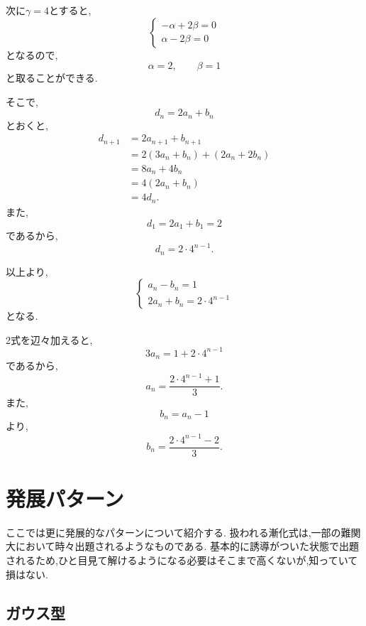 \documentclass[dvipdfmx,a4paper,11pt,fleqn,openany]{jsbook}
\begin{document}
\begin{enumerate}[label=(\arabic*),parsep=3pt]
            次に$\gamma=4$とすると,
            \[
            \begin{cases}
              -\alpha+2\beta=0\\
              \alpha-2\beta=0
            \end{cases}
            \]
            となるので,
            \[
              \alpha=2,\qquad\beta=1
            \]
            と取ることができる.

            そこで,
            \[
              d_n=2a_n+b_n
            \]
            とおくと,
            \begin{align*}
              d_{n+1}
                &=2a_{n+1}+b_{n+1}\\
                &=2(3a_n+b_n)+(2a_n+2b_n)\\
                &=8a_n+4b_n\\
                &=4(2a_n+b_n)\\
                &=4d_n.
            \end{align*}
            また,
            \[
              d_1=2a_1+b_1=2
            \]
            であるから,
            \[
              d_n=2\cdot4^{n-1}.
            \]

            以上より,
            \[
            \begin{cases}
              a_n-b_n=1\\
              2a_n+b_n=2\cdot4^{n-1}
            \end{cases}
            \]
            となる.

            2式を辺々加えると,
            \[
              3a_n=1+2\cdot4^{n-1}
            \]
            であるから,
            \[
              a_n=\frac{2\cdot4^{n-1}+1}{3}.
            \]
            また,
            \[
              b_n=a_n-1
            \]
            より,
            \[
              b_n=\frac{2\cdot4^{n-1}-2}{3}.
            \]
      \end{enumerate}
\section{発展パターン}
  ここでは更に発展的なパターンについて紹介する.
  扱われる漸化式は,一部の難関大において時々出題されるようなものである.
  基本的に誘導がついた状態で出題されるため,ひと目見て解けるようになる必要はそこまで高くないが,知っていて損はない.
  \subsection{ガウス型}
\end{document}
